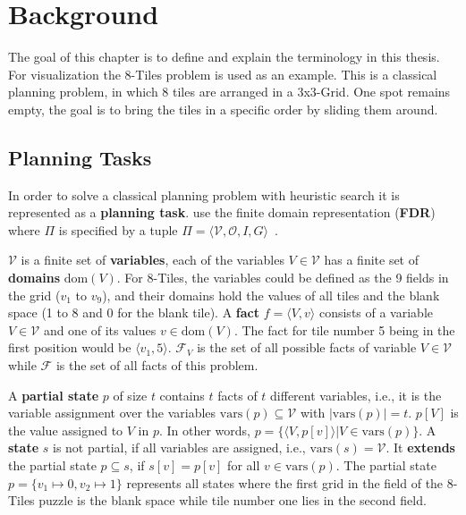 
\chapter{Background}\label{ch:background}

The goal of this chapter is to define and explain the terminology in this thesis.
For visualization the 8-Tiles problem is used as an example.
This is a classical planning problem, in which 8 tiles are arranged in a 3x3-Grid.
One spot remains empty, the goal is to bring the tiles in a specific order by sliding them around.

\section {Planning Tasks}\label{sec:planning-tasks}
In order to solve a classical planning problem with heuristic search it is represented as a \textbf{planning task}.
\citeauthor{fivser2020strengthening} use the finite domain representation (\textbf{FDR}) where $\Pi$ is specified by a tuple $ \Pi = \langle \mathcal{V}, \mathcal{O}, I, G \rangle$~\cite{helmert2009concise}.

$\mathcal{V}$ is a finite set of \textbf{variables}, each of the variables $V\in\mathcal{V}$ has a finite set of \textbf{domains} $\text{dom}(V)$.
For 8-Tiles, the variables could be defined as the 9 fields in the grid ($v_1$ to $v_9$), and their domains hold the values of all tiles and the blank space (1 to 8 and 0 for the blank tile).
A \textbf{fact} $f=\langle V, v\rangle$ consists of a variable $V\in\mathcal{V}$ and one of its values $v\in\text{dom}(V)$.
The fact for tile number 5 being in the first position would be $\langle v_1,5\rangle$.
$\mathcal{F}_V$ is the set of all possible facts of variable $V\in\mathcal{V}$ while $\mathcal{F}$ is the set of all facts of this problem.

A \textbf{partial state} $p$ of size $t$ contains $t$ facts of $t$ different variables, i.e., it is the variable assignment over the variables $\text{vars}(p)\subseteq\mathcal{V}$ with $|\text{vars}(p)|=t$.
$p[V]$ is the value assigned to $V$ in $p$.
In other words, $p=\{\langle V, p[v] \rangle | V\in\text{vars}(p)\}$.
A \textbf{state} $s$ is not partial, if all variables are assigned, i.e., $\text{vars}(s)=\mathcal{V}$.
It \textbf{extends} the partial state $p\subseteq s$, if $s[v] = p[v]$ for all $v \in\text{vars}(p)$.
The partial state $p = \{v_1\mapsto0, v_2\mapsto1\}$ represents all states where the first grid in the field of the 8-Tiles puzzle is the blank space while tile number one lies in the second field.

